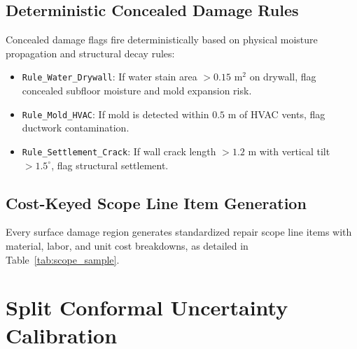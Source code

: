 \documentclass[10pt,twocolumn,a4paper]{article}
\begin{document}
\subsection{Deterministic Concealed Damage Rules}
Concealed damage flags fire deterministically based on physical moisture propagation and structural decay rules:
\begin{itemize}[leftmargin=*]
    \item \texttt{Rule_Water_Drywall}: If water stain area $> 0.15\text{ m}^2$ on drywall, flag concealed subfloor moisture and mold expansion risk.
    \item \texttt{Rule_Mold_HVAC}: If mold is detected within $0.5\text{ m}$ of HVAC vents, flag ductwork contamination.
    \item \texttt{Rule_Settlement_Crack}: If wall crack length $> 1.2\text{ m}$ with vertical tilt $> 1.5^\circ$, flag structural settlement.
\end{itemize}

\subsection{Cost-Keyed Scope Line Item Generation}
Every surface damage region generates standardized repair scope line items with material, labor, and unit cost breakdowns, as detailed in Table~\ref{tab:scope_sample}.

\begin{table}[h]
\centering
\caption{Sample Repair Scope Line Items}
\label{tab:scope_sample}
\end{table}

\section{Split Conformal Uncertainty Calibration}
\end{document}

